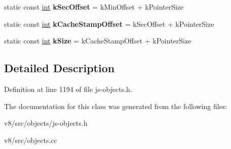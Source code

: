 \begin{DoxyCompactItemize}
static const \mbox{\hyperlink{classint}{int}} {\bfseries k\+Sec\+Offset} = k\+Min\+Offset + k\+Pointer\+Size
\item 
\mbox{\label{classv8_1_1internal_1_1JSDate_a9c1aa5942a2e169bae870d5150778dca}} 
static const \mbox{\hyperlink{classint}{int}} {\bfseries k\+Cache\+Stamp\+Offset} = k\+Sec\+Offset + k\+Pointer\+Size
\item 
\mbox{\label{classv8_1_1internal_1_1JSDate_a9416fc77a4defa89edf9d7f92b2a8348}} 
static const \mbox{\hyperlink{classint}{int}} {\bfseries k\+Size} = k\+Cache\+Stamp\+Offset + k\+Pointer\+Size
\end{DoxyCompactItemize}


\subsection{Detailed Description}


Definition at line 1194 of file js-\/objects.\+h.



The documentation for this class was generated from the following files\+:\begin{DoxyCompactItemize}
\item 
v8/src/objects/js-\/objects.\+h\item 
v8/src/objects.\+cc\end{DoxyCompactItemize}
